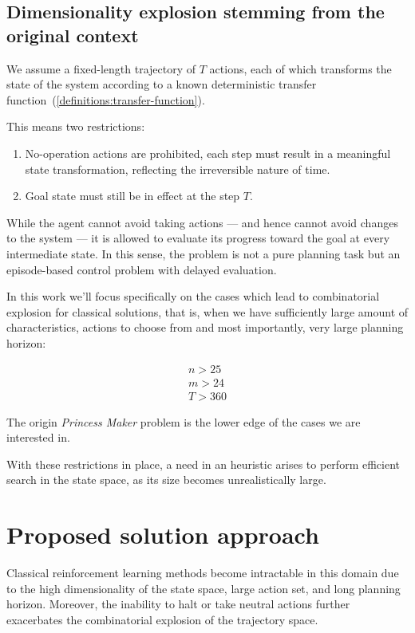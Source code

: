 \documentclass[12pt, a4paper]{report}
\begin{document}
	\section{Dimensionality explosion stemming from the original context}

	We assume a fixed-length trajectory of $𝑇$ actions, each of which transforms the state of the system according to a known deterministic transfer function~(\ref{definitions:transfer-function}).

	This means two restrictions:
	
	\begin{enumerate}
		\item No-operation actions are prohibited, each step must result in a meaningful state transformation, reflecting the irreversible nature of time.
		\item Goal state must still be in effect at the step $T$.
	\end{enumerate}

	While the agent cannot avoid taking actions — and hence cannot avoid changes to the system — it is allowed to evaluate its progress toward the goal at every intermediate state.
	In this sense, the problem is not a pure planning task but an episode-based control problem with delayed evaluation.
	
	In this work we'll focus specifically on the cases which lead to combinatorial explosion for classical solutions, that is, when we have sufficiently large amount of characteristics, actions to choose from and most importantly, very large planning horizon:
	
	\begin{eqnarray}
		n > 25 \\
		m > 24 \\
		T > 360
	\end{eqnarray}
	
	The origin \textit{Princess Maker} problem is the lower edge of the cases we are interested in.

	With these restrictions in place, a need in an heuristic arises to perform efficient search in the state space, as its size becomes unrealistically large.
	
	\chapter{Proposed solution approach}\label{section::solution}

Classical reinforcement learning methods become intractable in this domain due to the high dimensionality of the state space, large action set, and long planning horizon. Moreover, the inability to halt or take neutral actions further exacerbates the combinatorial explosion of the trajectory space.
\end{document}
